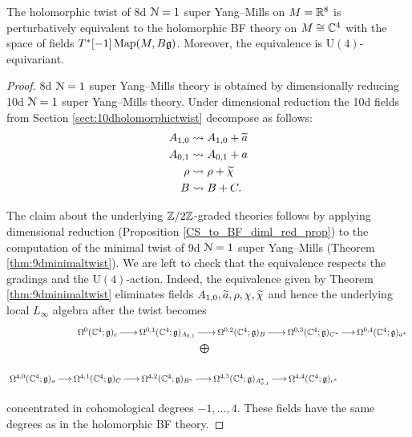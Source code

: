 \documentclass[10pt, oneside]{article}
\renewcommand{\U}{\mathrm{U}}
\begin{document}
\begin{theorem}
The holomorphic twist of 8d $\mathcal N=1$ super Yang--Mills on $M=\mathbb R^8$ is perturbatively equivalent to the holomorphic BF theory on $M\cong\mathbb C^4$ with the space of fields $T^*[-1]\operatorname{Map}(M, B\mathfrak g)$. Moreover, the equivalence is $\U(4)$-equivariant.
\label{thm:8dholomorphictwist}
\end{theorem}
\begin{proof}
8d $\mathcal N=1$ super Yang--Mills theory is obtained by dimensionally reducing 10d $\mathcal N=1$ super Yang--Mills theory. Under dimensional reduction the 10d fields from Section \ref{sect:10dholomorphictwist} decompose as follows:
\begin{align*}
A_{1, 0}&\rightsquigarrow A_{1, 0}+ \widetilde{a} \\
A_{0, 1}&\rightsquigarrow A_{0, 1}+ a \\
\rho&\rightsquigarrow \rho+ \widetilde{\chi} \\
B&\rightsquigarrow B+ C.
\end{align*}

The claim about the underlying $\mathbb Z/2\mathbb Z$-graded theories follows by applying dimensional reduction (Proposition \ref{CS_to_BF_diml_red_prop}) to the computation of the minimal twist of 9d $\mathcal N=1$ super Yang--Mills (Theorem \ref{thm:9dminimaltwist}). We are left to check that the equivalence respects  the gradings and the $\U(4)$-action. Indeed, the equivalence given by Theorem \ref{thm:9dminimaltwist} eliminates fields $A_{1, 0}, \widetilde{a}, \rho, \chi, \widetilde{\chi}$ and hence the underlying local $L_\infty$ algebra after the twist becomes
\[
\xymatrix@R=0.5cm@C=0.5cm{
&\Omega^0(\CC^4; \gg)_c \ar[r] &\Omega^{0,1}(\CC^4; \gg)_{A_{0,1}} \ar[r] &\Omega^{0,2}(\CC^4; \gg)_{B} \ar[r] &\Omega^{0,3}(\CC^4; \gg)_{C^*} \ar[r] &\Omega^{0,4}(\CC^4; \gg)_{a^*} \\
&&\ar@{}^{\bigoplus}[r] &&& \\
\Omega^{4,0}(\CC^4; \gg)_{a} \ar[r] &\Omega^{4,1}(\CC^4; \gg)_C \ar[r] &\Omega^{4,2}(\CC^4; \gg)_{B^*} \ar[r] &\Omega^{4,3}(\CC^4; \gg)_{A_{0,1}^*} \ar[r] &\Omega^{4,4}(\CC^4; \gg)_{c^*}&
}
\]

concentrated in cohomological degrees $-1, \dots, 4$. These fields have the same degrees as in the holomorphic BF theory.
\end{proof}
\end{document}
